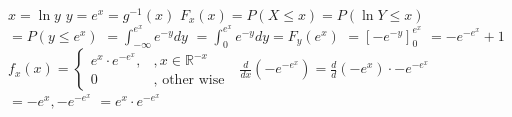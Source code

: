 $x=\ln y$
$y=e^{x}=g^{-1}(x)$
$F_{x}(x)=P(X \leq x)=P(\ln Y \leq x)$
$=P\left(y \leq e^{x}\right)$
$=\int_{-\infty}^{e^{x}} e^{-y} d y$
$=\int_{0}^{e^{x}} e^{-y} d y=F_{y}\left(e^{x}\right)$
$=\left[-e^{-y}\right]_{0}^{e^{x}}$
$=-e^{-e^{x}}+1$
$f_{x}(x)=\left\{\begin{array}{cc}e^{x} \cdot e^{-e^{x}}, & , x \in \mathbb{R}^{-x} \\ 0 & , \text { other wise }\end{array}\right.$
$\frac{d}{d x}\left(-e^{-e^{x}}\right)=\frac{d}{d}\left(-e^{x}\right) \cdot-e^{-e^{x}}$
$=-e^{x},-e^{-e^{x}}$
$=e^{x} \cdot e^{-e^{x}}$